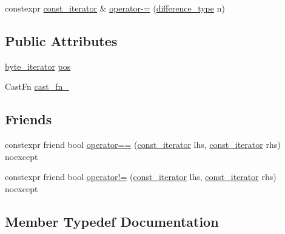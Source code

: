 \begin{DoxyCompactItemize}
\item 
constexpr \mbox{\hyperlink{structirk_1_1index_1_1skip__list__view_1_1const__iterator}{const\+\_\+iterator}} \& \mbox{\hyperlink{structirk_1_1index_1_1skip__list__view_1_1const__iterator_a9c0cdba672b1c2b523ab5a840284d34f}{operator-\/=}} (\mbox{\hyperlink{structirk_1_1index_1_1skip__list__view_1_1const__iterator_afcba20bb907a231114679979015f77f5}{difference\+\_\+type}} n)
\end{DoxyCompactItemize}
\subsection*{Public Attributes}
\begin{DoxyCompactItemize}
\item 
\mbox{\hyperlink{namespaceirk_1_1index_a4089fad8418d09bec3dd2a7ff91d1cea}{byte\+\_\+iterator}} \mbox{\hyperlink{structirk_1_1index_1_1skip__list__view_1_1const__iterator_ae8edc3733ccabb25cbcdc1cdf8b72a9a}{pos}}
\item 
Cast\+Fn \mbox{\hyperlink{structirk_1_1index_1_1skip__list__view_1_1const__iterator_a6e3df1b2579be0c2162535f45a65b000}{cast\+\_\+fn\+\_\+}}
\end{DoxyCompactItemize}
\subsection*{Friends}
\begin{DoxyCompactItemize}
\item 
constexpr friend bool \mbox{\hyperlink{structirk_1_1index_1_1skip__list__view_1_1const__iterator_a665f31dd0863021bd6b740d244346aeb}{operator==}} (\mbox{\hyperlink{structirk_1_1index_1_1skip__list__view_1_1const__iterator}{const\+\_\+iterator}} lhs, \mbox{\hyperlink{structirk_1_1index_1_1skip__list__view_1_1const__iterator}{const\+\_\+iterator}} rhs) noexcept
\item 
constexpr friend bool \mbox{\hyperlink{structirk_1_1index_1_1skip__list__view_1_1const__iterator_a6d10ed131252173e51fcf80bcdabeb72}{operator!=}} (\mbox{\hyperlink{structirk_1_1index_1_1skip__list__view_1_1const__iterator}{const\+\_\+iterator}} lhs, \mbox{\hyperlink{structirk_1_1index_1_1skip__list__view_1_1const__iterator}{const\+\_\+iterator}} rhs) noexcept
\end{DoxyCompactItemize}


\subsection{Member Typedef Documentation}
\mbox{\label{structirk_1_1index_1_1skip__list__view_1_1const__iterator_afcba20bb907a231114679979015f77f5}} 
